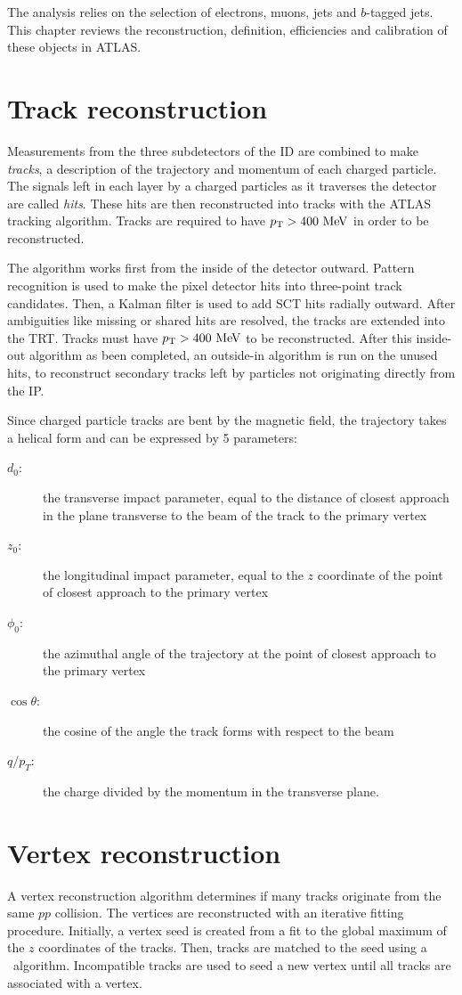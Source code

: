 
The analysis relies on the selection of electrons, muons, jets and $b$-tagged jets. This chapter reviews the reconstruction, definition, efficiencies and calibration of these objects in ATLAS.
\section{Track reconstruction}
Measurements from the three subdetectors of the ID are combined to make \emph{tracks}, a description of the trajectory and momentum of each charged particle. The signals left in each layer by a charged particles as it traverses the detector are called \emph{hits}. These hits are then reconstructed into tracks with the ATLAS tracking algorithm\cite{ATLAS-CONF-2012-042}. Tracks are required to have $\pt > 400 \mev$ in order to be reconstructed.

The algorithm works first from the inside of the detector outward. Pattern recognition is used to make the pixel detector hits into three-point track candidates. Then, a Kalman filter is used to add SCT hits radially outward. After ambiguities like missing or shared hits are resolved, the tracks are extended into the TRT. Tracks must have $\pt > 400 \mev$ to be reconstructed. After this inside-out algorithm as been completed, an outside-in algorithm is run on the unused hits, to reconstruct secondary tracks left by particles not originating directly from the IP.

Since charged particle tracks are bent by the magnetic field, the trajectory takes a helical form and can be expressed by 5 parameters: 
\begin{description}
\item[$d_0$:] the transverse impact parameter, equal to the distance of closest approach in the plane transverse to the beam of the track to the primary vertex
\item[$z_0$:] the longitudinal impact parameter, equal to the $z$ coordinate of the point of closest approach to the primary vertex
\item[$\phi_0$:] the azimuthal angle of the trajectory at the point of closest approach to the primary vertex
\item[$\cos\theta$:] the cosine of the angle the track forms with respect to the beam
\item[$q/p_T$:] the charge divided by the momentum in the transverse plane.
\end{description}



\section{Vertex reconstruction}
A vertex reconstruction algorithm determines if many tracks originate from the same $pp$ collision\cite{ATLAS-CONF-2010-069,ATLAS-CONF-2012-042}. The vertices are reconstructed with an iterative fitting procedure. Initially, a vertex seed is created from a fit to the global maximum of the $z$ coordinates of the tracks. Then, tracks are matched to the seed using a \chisq\ algorithm. Incompatible tracks are used to seed a new vertex until all tracks are associated with a vertex.

